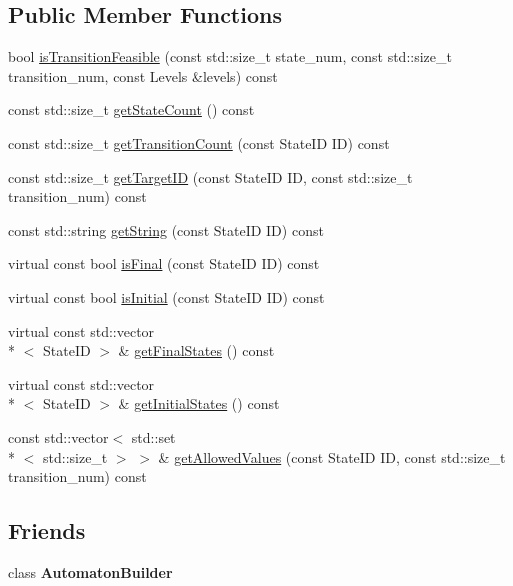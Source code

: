 \subsection*{Public Member Functions}
\begin{DoxyCompactItemize}
\item 
bool \hyperlink{class_automaton_structure_a2689322b0565e3b51f9cc686427968c6}{is\-Transition\-Feasible} (const std\-::size\-\_\-t state\-\_\-num, const std\-::size\-\_\-t transition\-\_\-num, const Levels \&levels) const 
\item 
const std\-::size\-\_\-t \hyperlink{class_automaton_structure_afbf3e5ca9e52d6f2c34dd0a2e756042f}{get\-State\-Count} () const 
\item 
const std\-::size\-\_\-t \hyperlink{class_automaton_structure_a0bbbfb2a0afe9df444e0a02688bedfab}{get\-Transition\-Count} (const State\-I\-D I\-D) const 
\item 
const std\-::size\-\_\-t \hyperlink{class_automaton_structure_a6330561343572c474e43bc95a9d8b7bb}{get\-Target\-I\-D} (const State\-I\-D I\-D, const std\-::size\-\_\-t transition\-\_\-num) const 
\item 
const std\-::string \hyperlink{class_automaton_structure_a2771a16165276e75d30974e21821de3f}{get\-String} (const State\-I\-D I\-D) const 
\item 
virtual const bool \hyperlink{class_automaton_structure_ab78811554076d892276a623c579a2b8b}{is\-Final} (const State\-I\-D I\-D) const 
\item 
virtual const bool \hyperlink{class_automaton_structure_ac5aded68ef2f70ad78412b3e0e6cd6f2}{is\-Initial} (const State\-I\-D I\-D) const 
\item 
virtual const std\-::vector\\*
$<$ State\-I\-D $>$ \& \hyperlink{class_automaton_structure_a3abac2abd6655525dc4a23a6d8f9163d}{get\-Final\-States} () const 
\item 
virtual const std\-::vector\\*
$<$ State\-I\-D $>$ \& \hyperlink{class_automaton_structure_ad8a7299f02b49311d847ffc065980b7e}{get\-Initial\-States} () const 
\item 
const std\-::vector$<$ std\-::set\\*
$<$ std\-::size\-\_\-t $>$ $>$ \& \hyperlink{class_automaton_structure_a526795491b1a740d7686b0687378d627}{get\-Allowed\-Values} (const State\-I\-D I\-D, const std\-::size\-\_\-t transition\-\_\-num) const 
\end{DoxyCompactItemize}
\subsection*{Friends}
\begin{DoxyCompactItemize}
\item 
\hypertarget{class_automaton_structure_aa8c70fdebc72ce387f4c6dbf6291f149}{class {\bfseries Automaton\-Builder}}\label{class_automaton_structure_aa8c70fdebc72ce387f4c6dbf6291f149}

\end{DoxyCompactItemize}


